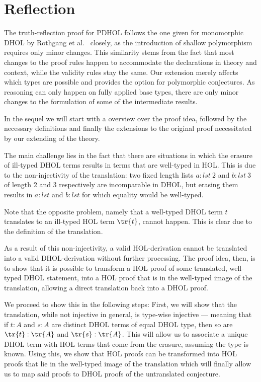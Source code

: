 \section{Reflection}\label{app:sound}
The truth-reflection proof for PDHOL follows the one given for monomorphic DHOL by
Rothgang et al.~\cite{RRB23ext} closely, as the introduction of shallow polymorphism requires
only minor 
changes. This similarity stems from the fact that most changes to the proof rules happen to
accommodate the declarations in theory and context, while the validity rules stay the
same.  Our extension merely affects which types are possible and provides the option for polymorphic
conjectures. As reasoning can only happen on fully applied base types, there are only minor
changes to the formulation of some of the intermediate results.

In the sequel we will start with a overview over the proof idea, followed by the
necessary definitions and finally the extensions to the original proof necessitated by our
extending of the theory. 

The main challenge lies in the fact
that there are situations in which the erasure of ill-typed DHOL terms results in terms that
are well-typed in HOL. This is due to the non-injectivity of the translation: two fixed
length lists \(a:lst\: 2\) and \(b:lst\: 3\) of length 2 and 3 respectively are incomparable in
DHOL, but erasing them results in \(a:lst\) and \(b:lst\) for which equality would be well-typed.

Note that the opposite problem, namely that a well-typed DHOL term \(t\) translates to an
ill-typed HOL term \(\tr{t}\), cannot happen. This is clear due to the definition of the
translation.

As a result of this non-injectivity, a valid HOL-derivation cannot be translated into a valid
DHOL-derivation without further processing. The proof idea, then, is to show that it is
possible to transform a HOL proof of some translated, well-typed DHOL statement, into a
HOL proof that is in the well-typed image of the translation, allowing a direct translation
back into a DHOL proof. 

We proceed to show this in the following steps: First, we will show that the translation, while
not injective in general, is type-wise injective --- meaning that if \(t:A\) and \(s:A\) are
distinct DHOL terms of equal DHOL type, then so are \(\tr{t}:\tr{A}\) and \(\tr{s}:\tr{A}\).
This will allow us to associate a unique DHOL term with HOL terms that come from the 
erasure, assuming the type is known. Using this, we show that HOL proofs can be transformed
into HOL proofs that lie in the well-typed image of the translation which will finally allow us
to map said proofs to DHOL proofs of the untranslated conjecture. 

